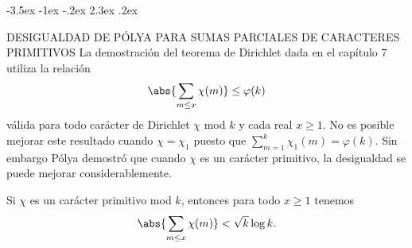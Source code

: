 \documentclass[12pt,a4paper]{book}
\makeatletter
\renewcommand\section{\@startsection{section}{1}{\z@}%
  {-3.5ex \@plus -1ex \@minus -.2ex}%
  {2.3ex \@plus .2ex}%
  {\normalfont\Large\bfseries\raggedright}}
\makeatother
\begin{document}
    \section{DESIGUALDAD DE PÓLYA PARA SUMAS PARCIALES DE CARACTERES PRIMITIVOS}
    La demostración del teorema de Dirichlet dada en el capítulo 7 utiliza la relación
    \begin{equation*}
        \abs{\sum_{m\leq x}\chi(m)}\leq\varphi(k)
    \end{equation*}
    válida para todo carácter de Dirichlet $\chi$ mod $k$ y cada real $x\geq1$. No es
    posible mejorar este resultado cuando $\chi=\chi_{1}$ puesto que
    $\sum_{m=1}^{k}\chi_{1}(m)=\varphi(k)$. Sin embargo Pólya demostró que cuando $\chi$ es un
    carácter primitivo, la desigualdad se puede mejorar considerablemente.

    \begin{teorema}
        Si $\chi$ es un carácter primitivo mod $k$, entonces para todo $x\geq1$ tenemos
        \begin{equation}\label{eq:8-23}
            \abs{\sum_{m\leq x}\chi(m)}<\sqrt{k}\log k.
        \end{equation}
    \end{teorema}
\end{document}
